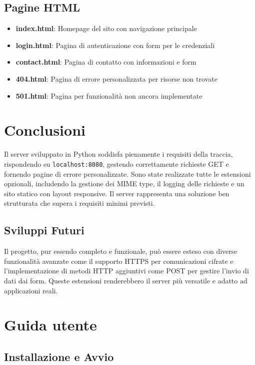 \documentclass[a4paper,12pt]{report}
\begin{document}
\section{Pagine HTML}

\begin{itemize}
    \item \textbf{index.html}: Homepage del sito con navigazione principale
    \item \textbf{login.html}: Pagina di autenticazione con form per le credenziali
    \item \textbf{contact.html}: Pagina di contatto con informazioni e form
    \item \textbf{404.html}: Pagina di errore personalizzata per risorse non trovate
    \item \textbf{501.html}: Pagina per funzionalità non ancora implementate
\end{itemize}

\chapter{Conclusioni}

Il server sviluppato in Python soddisfa pienamente i requisiti della traccia, rispondendo su \texttt{localhost:8080}, gestendo correttamente richieste GET e fornendo pagine di errore personalizzate. 
Sono state realizzate tutte le estensioni opzionali, includendo la gestione dei MIME type, il logging delle richieste e un sito statico con layout responsive. 
Il server rappresenta una soluzione ben strutturata che supera i requisiti minimi previsti.

\section{Sviluppi Futuri}

Il progetto, pur essendo completo e funzionale, può essere esteso con diverse funzionalità avanzate come il supporto HTTPS per comunicazioni cifrate e l'implementazione di metodi HTTP aggiuntivi come POST per gestire l'invio di dati dai form. Queste estensioni renderebbero il server più versatile e adatto ad applicazioni reali.

\appendix
\chapter{Guida utente}

\section{Installazione e Avvio}
\end{document}
